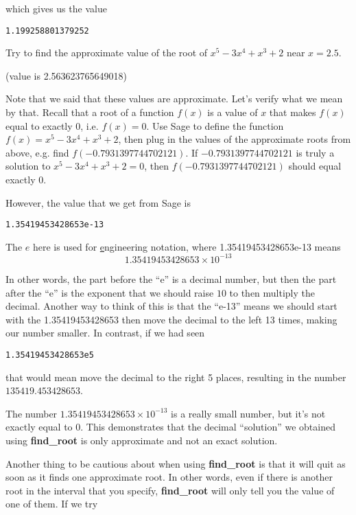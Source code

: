 which gives us the value

\begin{verbatim}
1.199258801379252
\end{verbatim}

Try to find the approximate value of the root of $x^5-3x^4+x^3+2$
near $x=2.5$.

(value is 2.563623765649018)

Note that we said that these values are approximate. Let's verify
what we mean by that. Recall that a root of a function $f(x)$ is
a value of $x$ that makes $f(x)$ equal to exactly $0$, i.e.
$f(x)=0$. Use Sage to define the function $f(x)=x^5-3x^4+x^3+2$,
then plug in the values of the approximate roots from above,
e.g. find $f(-0.7931397744702121)$. If $-0.7931397744702121$
is truly a solution to $x^5-3x^4+x^3+2=0$, then
$f(-0.7931397744702121)$ should equal exactly 0.

However, the value that we get from Sage is

\begin{verbatim}
1.35419453428653e-13
\end{verbatim}

The $e$ here is used for \underline{e}ngineering notation,
where 1.35419453428653e-13 means
\begin{equation*}
1.35419453428653\times 10^{-13}
\end{equation*}

In other words, the part before the ``e'' is a decimal number,
but then the part after the ``e'' is the exponent that we should
raise $10$ to then multiply the decimal. Another way to think of
this is that the ``e-13'' means we should start with the
1.35419453428653 then move the decimal to the left 13 times,
making our number smaller. In contrast, if we had seen

\begin{verbatim}1.35419453428653e5\end{verbatim}

that would mean move the decimal to the right 5 places, resulting
in the number $135419.453428653$.

The number $1.35419453428653\times 10^{-13}$ is a really
small number, but it's not exactly equal to 0. This 
demonstrates that the decimal ``solution'' we obtained using
\textbf{find\_root} is only approximate and not an exact solution.

Another thing to be cautious about when using \textbf{find\_root}
is that it will quit as soon as it finds one approximate root. In other
words, even if there is another root in the interval that you specify,
\textbf{find\_root} will only tell you the value of one of them. If we
try

